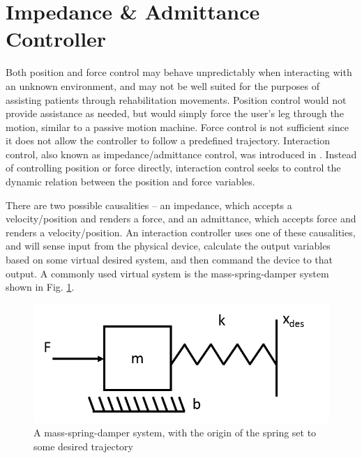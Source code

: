 \documentclass[12pt]{report}
\begin{document}
	\section{Impedance \& Admittance Controller} \label{Sec:imp}

%

Both position and force control may behave unpredictably when interacting with an unknown environment, and may not be well suited for the purposes of assisting patients through rehabilitation movements. Position control would not provide assistance as needed, but would simply force the user's leg through the motion, similar to a passive motion machine. Force control is not sufficient since it does not allow the controller to follow a predefined trajectory. Interaction control, also known as impedance/admittance control, was introduced in \cite{Hogan1985}. Instead of controlling position or force directly, interaction control seeks to control the dynamic relation between the position and force variables. 
	
There are two possible causalities -- an impedance, which accepts a velocity/position and renders a force, and an admittance, which accepts force and renders a velocity/position. An interaction controller uses one of these causalities, and will sense input from the physical device, calculate the output variables based on some virtual desired system, and then command the device to that output. A commonly used virtual system is the mass-spring-damper system shown in Fig. \ref{fig:mass-spring-damper}. 

	\begin{figure}[h] 
		\centering
		\includegraphics[width=0.75\linewidth]{admittance_sys}
		\caption{A mass-spring-damper system, with the origin of the spring set to some desired trajectory}
		\label{fig:mass-spring-damper}
	\end{figure}
	
\end{document}
